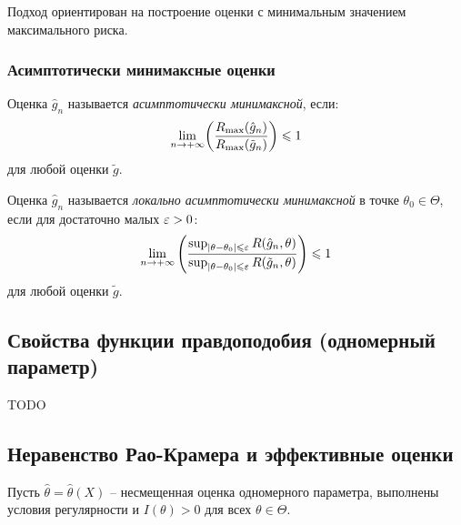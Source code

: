 Подход ориентирован на построение оценки с минимальным значением максимального риска.

\subsubsection{Асимптотически минимаксные оценки}
\begin{definition}
	Оценка $\hat{g}_{n}$ называется \textit{асимптотически минимаксной}, если:
	\[
		\lim_{n \to +\infty}\parens*{\frac{R_{\max}(\hat{g}_n)}{R_{\max}(\tilde{g}_n)}} \leqslant 1
	\]
	для любой оценки $\tilde{g}$.
\end{definition}

\begin{definition}
	Оценка $\hat{g}_{n}$ называется \textit{локально асимптотически минимаксной}
    в точке $\theta_{0} \in \Theta$, если для достаточно малых $\e > 0$:
	\[
        \lim_{n \to +\infty}{\parens*{\frac{\sup_{\abs{\theta - \theta_0}
                \leqslant \varepsilon}{R(\hat{g}_n, \theta)}}
                {\sup_{\abs{\theta - \theta_0} \leqslant \varepsilon}
        {R(\tilde{g}_n, \theta)}}}} \leqslant 1
	\]
	для любой оценки $\tilde{g}$.
\end{definition}

\subsection{Свойства функции правдоподобия (одномерный параметр)}
TODO

\subsection{Неравенство Рао-Крамера и эффективные оценки}
Пусть $\hat{\theta} = \hat{\theta}(X)$ -- несмещенная оценка одномерного параметра, выполнены условия регулярности и $I(\theta) > 0$ для всех $\theta \in \Theta$.

